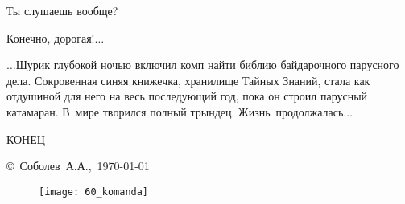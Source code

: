 {\diagdash Ты слушаешь вообще?

\diagdash Конечно, дорогая!$\ldots$

$\ldots$Шурик глубокой ночью включил комп найти библию байдарочного парусного дела\cite{Перегудов}. Сокровенная синяя книжечка, хранилище Тайных Знаний, стала как отдушиной для него на весь последующий год, пока он строил парусный катамаран. В~мире творился полный трындец. Жизнь~продолжалась$\ldots$


%


\begin{center}
\end{center}

\begin{center}
	\Large {КОНЕЦ}
\end{center}
}

\vspace*{\fill}
\begin{flushright}
	\copyright~Соболев~А.А.,~\today\\
\end{flushright}







\fancyhead[LE]{\fancyplain{}{}}
\fancyhead[RO]{\fancyplain{}{}}

\vspace*{4.0em}

\begin{figure}[!h]
	\centering
	\texttt{[image: 60\_komanda]}
\end{figure}



